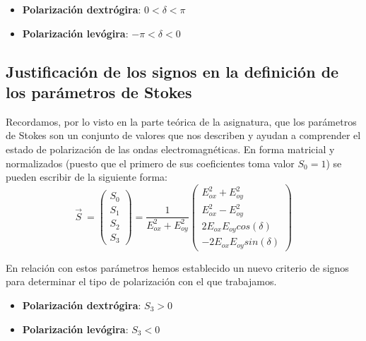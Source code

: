 \documentclass[11pt]{article}
\begin{document}
    \begin{tcolorbox}[colback=gris,colframe=azuloscuro,title=Criterio de signos respecto a las ecuaciones de onda que usa el programa]
    \begin{itemize}
        \item \textbf{Polarización dextrógira}: $0 < \delta < \pi$
        \item \textbf{Polarización levógira}: $-\pi < \delta < 0$
    \end{itemize}
    \end{tcolorbox}\label{box:criterio programa}
    
    \subsection{Justificación de los signos en la definición de los parámetros de Stokes}
    \noindent Recordamos, por lo visto en la parte teórica de la asignatura, que los parámetros de Stokes son un conjunto de valores que nos describen y ayudan a comprender el estado de polarización de las ondas electromagnéticas. En forma matricial y normalizados (puesto que el primero de sus coeficientes toma valor $S_0 = 1$) se pueden escribir de la siguiente forma:
    \begin{equation}
    {\displaystyle {\vec {S}}\ ={\begin{pmatrix}S_{0}\\S_{1}\\S_{2}\\S_{3}\end{pmatrix}}={\frac{1}{E_{ox}^2+E_{oy}^2}\begin{pmatrix}E_{ox}^2+E_{oy}^2\\E_{ox}^2-E_{oy}^2\\2E_{ox}E_{oy}cos(\delta)\\-2E_{ox}E_{oy}sin(\delta)\end{pmatrix}}}
    \end{equation} \label{eq:stokes teoria}
    
    \noindent En relación con estos parámetros hemos establecido un nuevo criterio de signos para determinar el tipo de polarización con el que trabajamos.
    
    \begin{tcolorbox}[colback=gris,colframe=azuloscuro,title=Criterio de signos respecto a los parámetros de Stokes]
    \begin{itemize}
        \item \textbf{Polarización dextrógira}: $S_3 > 0$
        \item \textbf{Polarización levógira}: $S_3 < 0$
    \end{itemize}
    \end{tcolorbox}\label{box:criterio Stokes}
    
\end{document}

